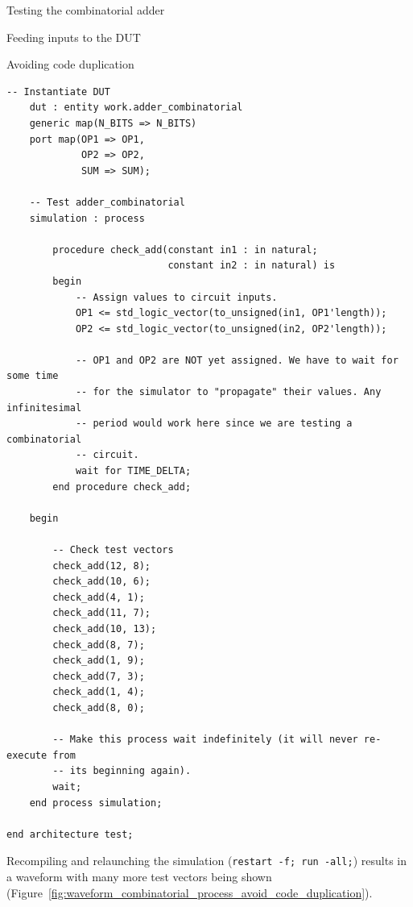 \documentclass[lab]{course}
\begin{document}
\begin{section}{Testing the combinatorial adder}
\begin{subsection}{Feeding inputs to the DUT}
\begin{subsubsection}{Avoiding code duplication}
\begin{lstlisting}[caption={Refactored test vector feeding code into a \emph{procedure} called \texttt{check\_add}}, captionpos=b, label={lst:combinatorial_refactored_test_vector_feeding_code}]
    -- Instantiate DUT
    dut : entity work.adder_combinatorial
    generic map(N_BITS => N_BITS)
    port map(OP1 => OP1,
             OP2 => OP2,
             SUM => SUM);

    -- Test adder_combinatorial
    simulation : process

        procedure check_add(constant in1 : in natural;
                            constant in2 : in natural) is
        begin
            -- Assign values to circuit inputs.
            OP1 <= std_logic_vector(to_unsigned(in1, OP1'length));
            OP2 <= std_logic_vector(to_unsigned(in2, OP2'length));

            -- OP1 and OP2 are NOT yet assigned. We have to wait for some time
            -- for the simulator to "propagate" their values. Any infinitesimal
            -- period would work here since we are testing a combinatorial
            -- circuit.
            wait for TIME_DELTA;
        end procedure check_add;

    begin

        -- Check test vectors
        check_add(12, 8);
        check_add(10, 6);
        check_add(4, 1);
        check_add(11, 7);
        check_add(10, 13);
        check_add(8, 7);
        check_add(1, 9);
        check_add(7, 3);
        check_add(1, 4);
        check_add(8, 0);

        -- Make this process wait indefinitely (it will never re-execute from
        -- its beginning again).
        wait;
    end process simulation;

end architecture test;
            \end{lstlisting}

            Recompiling and relaunching the simulation (\verb+restart -f; run -all;+) results in a waveform with many more test vectors being shown (Figure~\ref{fig:waveform_combinatorial_process_avoid_code_duplication}).


\end{subsubsection}
\end{subsection}
\end{section}
\end{document}
